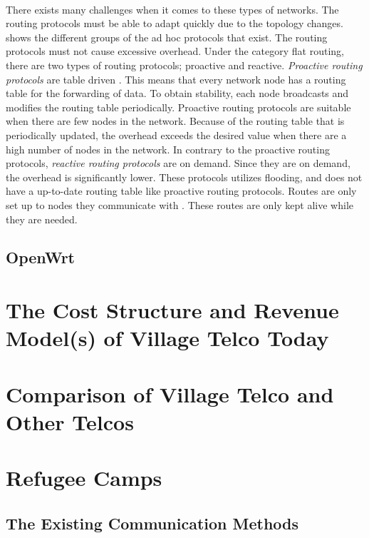 \paragraph{}
There exists many challenges when it comes to these types of networks. The routing protocols must be able to adapt quickly due to the topology changes.  shows the different groups of the ad hoc protocols that exist. The routing protocols must not cause excessive overhead. Under the category flat routing, there are two types of routing protocols; proactive and reactive. \textit{Proactive routing protocols} are table driven \citep{proactivereactive}. This means that every network node has a routing table for the forwarding of data. To obtain stability, each node broadcasts and modifies the routing table periodically. Proactive routing protocols are suitable when there are few nodes in the network. Because of the routing table that is periodically updated, the overhead exceeds the desired value when there are a high number of nodes in the network. In contrary to the proactive routing protocols, \textit{reactive routing protocols} are on demand. Since they are on demand, the overhead is significantly lower. These protocols utilizes flooding, and does not have a up-to-date routing table like proactive routing protocols. Routes are only set up to nodes they communicate with \cite{adhoc2}. These routes are only kept alive while they are needed. 





\subsection{OpenWrt}

\section{The Cost Structure and Revenue Model(s) of Village Telco Today}

\section{Comparison of Village Telco and Other Telcos}

\section{Refugee Camps}
\subsection{The Existing Communication Methods}
